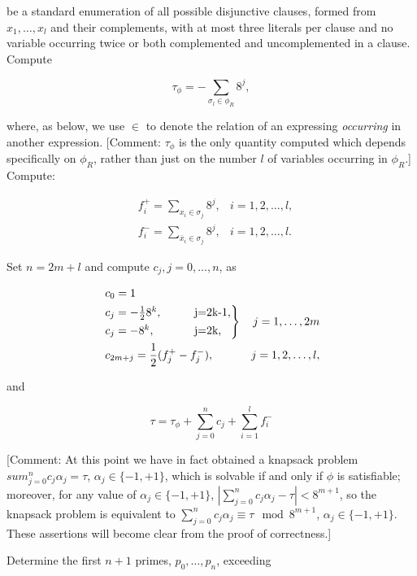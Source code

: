 \documentclass{amsart}
\newcommand{\ov}{\overline}
\theoremstyle{plain}
\numberwithin{equation}{section}
\begin{document}
be a standard enumeration of all possible disjunctive clauses, formed from $x_1,\ldots,x_l$ and
their complements, with at most three literals per clause and no variable occurring twice or both
complemented and uncomplemented in a clause. Compute

\begin{equation*}
  \tau_\phi = -\sum_{\sigma_l\in\phi_R}8^j,
\end{equation*}

where, as below, we use $\in$ to denote the relation of an expressing \textit{occurring} in another
expression. [Comment: $\tau_\phi$ is the only quantity computed which depends specifically on
$\phi_R$, rather than just on the number $l$ of variables occurring in $\phi_R$.] Compute:

\begin{align*}
  &f_i^+ = \sum_{x_i\in\sigma_j}8^j, &i=1,2,\ldots,l,\\
  &f_i^- = \sum_{\ov{x}_i\in\sigma_j}8^j, &i=1,2,\ldots,l.
\end{align*}

Set $n=2m+l$ and compute $c_j,j=0,\ldots,n$, as

\begin{align*}
  &\;c_0=1\\
  &\begin{rcases*}
  c_j=-\frac{1}{2}8^k,\qquad &j=2k-1,\\
  c_j=-8^k,\qquad &j=2k,\\
  \end{rcases*} &j=1,\ldots,2m\\
  &\;c_{2m+j}=\frac{1}{2}(f_j^+ - f_j^-), &j=1,2,\ldots,l,
\end{align*}

and

\begin{equation*}
  \tau = \tau_\phi + \sum_{j=0}^n c_j + \sum_{i=1}^l f_i^-
\end{equation*}

[Comment: At this point we have in fact obtained a knapsack problem $sum_{j=0}^n c_j\alpha_j=\tau$,
$\alpha_j\in\{-1, +1\}$, which is solvable if and only if $\phi$ is satisfiable; moreover, for any
value of $\alpha_j\in\{-1,+1\}$, $|\sum_{j=0}^n c_j\alpha_j -\tau|<8^{m+1}$, so the knapsack
problem is equivalent to $\sum_{j=0}^n c_j\alpha_j\equiv\tau\mod 8^{m+1}$, $\alpha_j\in\{-1,+1\}$.
These assertions will become clear from the proof of correctness.]

Determine the first $n+1$ primes, $p_0,\ldots,p_n$, exceeding
\end{document}
